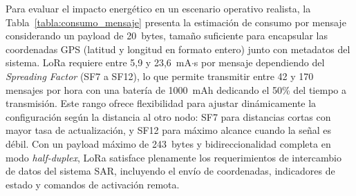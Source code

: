 Para evaluar el impacto energético en un escenario operativo realista, la Tabla~\ref{tabla:consumo_mensaje} presenta la estimación de consumo por mensaje considerando un payload de 20~bytes, tamaño suficiente para encapsular las coordenadas GPS (latitud y longitud en formato entero) junto con metadatos del sistema. LoRa requiere entre 5,9 y 23,6~mA$\cdot$s por mensaje dependiendo del \textit{Spreading Factor} (SF7 a SF12), lo que permite transmitir entre 42 y 170 mensajes por hora con una batería de 1000~mAh dedicando el 50\% del tiempo a transmisión. Este rango ofrece flexibilidad para ajustar dinámicamente la configuración según la distancia al otro nodo: SF7 para distancias cortas con mayor tasa de actualización, y SF12 para máximo alcance cuando la señal es débil. Con un payload máximo de 243~bytes y bidireccionalidad completa en modo \textit{half-duplex}, LoRa satisface plenamente los requerimientos de intercambio de datos del sistema SAR, incluyendo el envío de coordenadas, indicadores de estado y comandos de activación remota.

\begin{table}[H]
\begin{center}
\caption{Estimación de consumo por mensaje (payload de 20 bytes) y capacidad de transmisión por hora.}
\label{tabla:consumo_mensaje}
\end{center}
\end{table}


